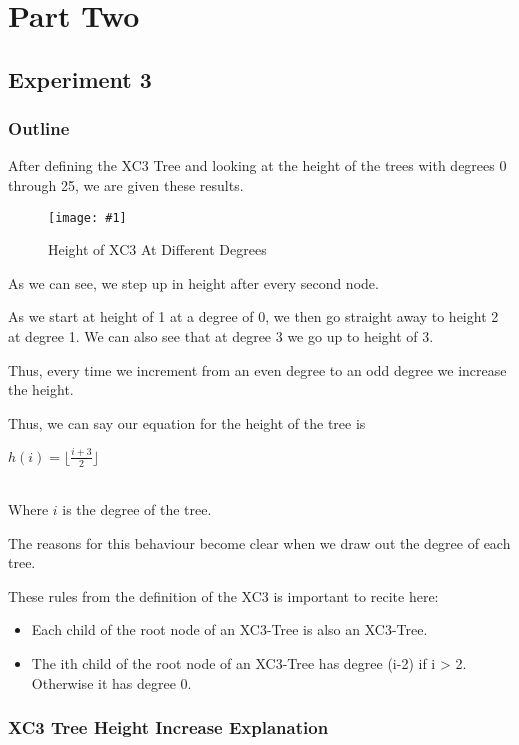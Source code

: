 \documentclass{article}
\newcommand{\figureInsetScaled}[3]
{
    \FloatBarrier{}
    \figureRaw{#1}{#2}{#3}
    \FloatBarrier{}
}
\newcommand{\figureRaw}[3]
{
    \begin{figure}[ht!]
        \centering
        \texttt{[image: \#1]}
        \caption{#2}
    \end{figure}
}
\begin{document}
\newpage
\section{Part Two}
\subsection{Experiment 3}

\subsubsection{Outline}

After defining the XC3 Tree and looking at the height of the trees with degrees 0 through 25, we are given these results.

\figureInsetScaled{images/experiment3/Figure_1.png}{Height of XC3 At Different Degrees}{0.65}

As we can see, we step up in height after every second node.

As we start at height of 1 at a degree of 0, we then go straight away to height 2 at degree 1. We can also see that at degree 3 we go up to height of 3.

Thus, every time we increment from an even degree to an odd degree we increase the height.

Thus, we can say our equation for the height of the tree is 
\\
{
\Large
\begin{center}
    $h(i) = \lfloor \frac{i+3}{2} \rfloor$\\
    $ $
\end{center}
}
\\
Where $i$ is the degree of the tree.

The reasons for this behaviour become clear when we draw out the degree of each tree.


These rules from the definition of the XC3 is important to recite here:

\begin{itemize}
    \item Each child of the root node of an XC3-Tree is also an XC3-Tree.
    \item The ith child of the root node of an XC3-Tree has degree (i-2) if i > 2. Otherwise it has degree 0.
\end{itemize}

\subsubsection{XC3 Tree Height Increase Explanation}
\end{document}
